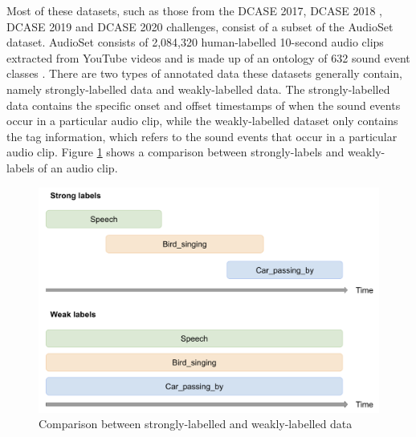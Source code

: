  Most of these datasets, such as those from the DCASE 2017\cite{DCASE2017}, DCASE 2018 \cite{DCASE2018}, DCASE 2019 \cite{DCASE2019} and DCASE 2020 \cite{DCASE2019, Wisdom_InPrep2020} challenges, consist of a subset of the AudioSet dataset. AudioSet consists of 2,084,320 human-labelled 10-second audio clips extracted from YouTube videos and is made up of an ontology of 632 sound event classes  \cite{audioset}. There are two types of annotated data these datasets generally contain, namely strongly-labelled data and weakly-labelled data. The strongly-labelled data contains the specific onset and offset timestamps of when the sound events occur in a particular audio clip, while the weakly-labelled dataset only contains the tag information, which refers to the sound events that occur in a particular audio clip. Figure \ref{fig:weak-vs-strong} shows a comparison between strongly-labels and weakly-labels of an audio clip.\\

\begin{figure}[!htb]
    \centering
    \includegraphics[width=\textwidth]{fig/weak-vs-strong.png}
    \caption{Comparison between strongly-labelled and weakly-labelled data}
    \label{fig:weak-vs-strong}
\end{figure}

